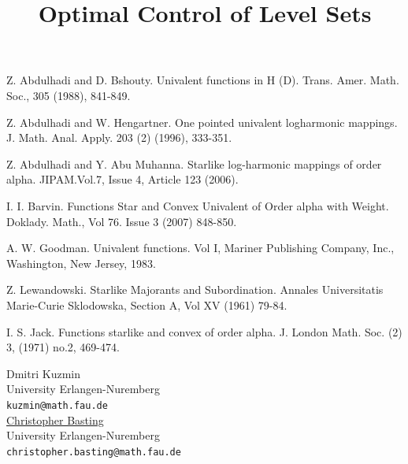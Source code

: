 \documentclass[article, A4, 11pt]{llncs}%
\begin{document}

\begin{thebibliography}{10}
{\sc Z. Abdulhadi and D. Bshouty}. {Univalent functions in H (D)}. Trans. Amer. Math. Soc., 305 (1988), 841-849.

{\sc Z. Abdulhadi and W. Hengartner}. {One pointed univalent logharmonic mappings}. J. Math. Anal. Apply. 203 (2) (1996), 333-351.

{\sc Z. Abdulhadi and Y. Abu Muhanna}. {Starlike log-harmonic mappings of order alpha}. JIPAM.Vol.7, Issue 4, Article 123 (2006).

{\sc I. I. Barvin}. {Functions Star and Convex Univalent of Order alpha with Weight}. Doklady. Math., Vol 76. Issue 3 (2007) 848-850.

{\sc A. W. Goodman}. {Univalent functions}. Vol I, Mariner Publishing Company, Inc., Washington, New Jersey, 1983.

{\sc Z. Lewandowski}. {Starlike Majorants and Subordination}. Annales Universitatis Marie-Curie Sklodowska, Section A, Vol XV (1961) 79-84.

{\sc I. S. Jack}. {Functions starlike and convex of order alpha}. J. London Math. Soc. (2) 3, (1971) no.2, 469-474.
\end{thebibliography} %

\title{Optimal Control of Level Sets}
 \author{} \institute{}
\maketitle
\begin{center}
{\large Dmitri Kuzmin}\\
University Erlangen-Nuremberg\\
{\tt kuzmin@math.fau.de}
\\ \vspace{4mm}
{\large \underline{Christopher Basting}}\\
University Erlangen-Nuremberg\\
{\tt christopher.basting@math.fau.de}
\end{center}
\end{document}
